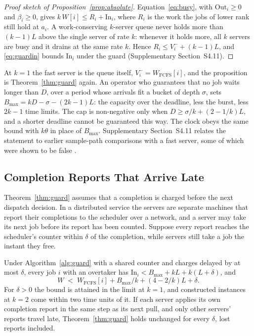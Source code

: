 \begin{proof}[Proof sketch of Proposition~\ref{prop:absolute}]
Equation~\eqref{eq:busy}, with $\mathrm{Out}_i \ge 0$ and $\beta_i \ge 0$, gives
$k\,W[i] \le R_i + \mathrm{In}_i$, where $R_i$ is the work the jobs of lower rank still hold
at $a_i$. A work-conserving $k$-server queue never holds more than $(k-1)L$ above the single
server of rate $k$: whenever it holds more, all $k$ servers are busy and it drains at the
same rate $k$. Hence $R_i \le V_i^- + (k-1)L$, and \eqref{eq:guardin} bounds
$\mathrm{In}_i$ under the guard (Supplementary Section~S4.11).
\end{proof}

At $k = 1$ the fast server is the queue itself, $V_i^- = W_{\mathrm{FCFS}}[i]$, and the
proposition is Theorem~\ref{thm:guard} again. An operator who guarantees that no job waits
longer than $D$, over a period whose arrivals fit a bucket of depth $\sigma$, sets
$B_{\max} = kD - \sigma - (2k-1)L$: the capacity over the deadline, less the burst, less
$2k-1$ time limits. The cap is non-negative only when $D \ge \sigma/k + (2 - 1/k)L$, and a
shorter deadline cannot be guaranteed this way. The clock obeys the same bound with
$k\theta$ in place of $B_{\max}$.
Supplementary Section~S4.11 relates the statement to earlier sample-path comparisons with a
fast server, some of which were shown to be false \cite{wolff1987work}.

\subsection{Completion Reports That Arrive Late}
\label{sec:late}

Theorem~\ref{thm:guard} assumes that a completion is charged before the next dispatch
decision. In a distributed service the servers are separate machines that report their
completions to the scheduler over a network, and a server may take its next job before its
report has been counted. Suppose every report reaches the scheduler's counter within
$\delta$ of the completion, while servers still take a job the instant they free.

\begin{proposition}
\label{prop:late}
Under Algorithm~\ref{alg:guard} with a shared counter and charges delayed by at most
$\delta$, every job $i$ with an overtaker has $\mathrm{In}_i < B_{\max} + kL + k(L + \delta)$,
and
\begin{equation}
  W \;<\; W_{\mathrm{FCFS}}[i] + B_{\max}/k + (4 - 2/k)L + \delta .
  \label{eq:late}
\end{equation}
For $\delta > 0$ the bound is attained in the limit at $k = 1$, and constructed instances at
$k = 2$ come within two time units of it. If each
server applies its own completion report in the same step as its next pull, and only other
servers' reports travel late, Theorem~\ref{thm:guard} holds unchanged for every $\delta$,
lost reports included.
\end{proposition}

